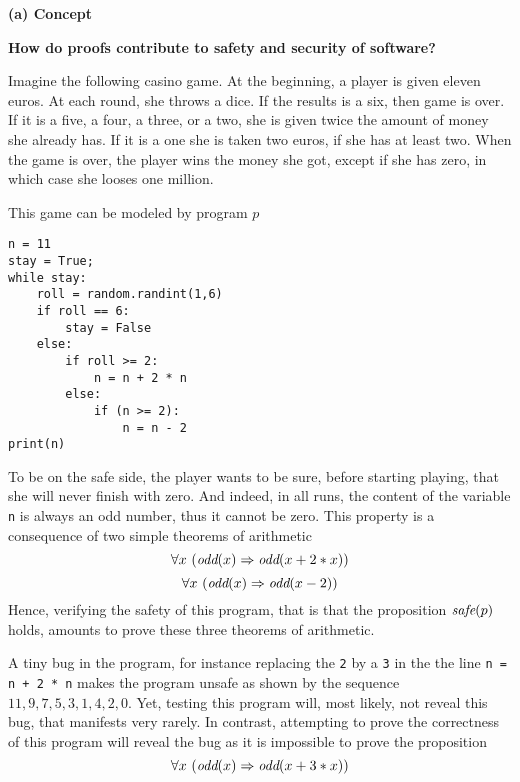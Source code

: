 {\bf \Large (a) Concept}

\begin{framed}
\begin{center}
{\bf \Large How do proofs contribute to safety and security of software?}
\end{center}
  
Imagine the following casino game. At the beginning, a player is given
eleven euros. At each round, she throws a dice. If the results is a
six, then game is over.  If it is a five, a four, a three, or a two,
she is given twice the amount of money she already has. If it is a one
she is taken two euros, if she has at least two.  When the game is
over, the player wins the money she got, except if she has zero, in
which case she looses one million.

This game can be modeled by program $p$
\begin{verbatim}
n = 11
stay = True;
while stay: 
    roll = random.randint(1,6)
    if roll == 6:
        stay = False
    else:
        if roll >= 2:
            n = n + 2 * n
        else:
            if (n >= 2):
                n = n - 2
print(n)
\end{verbatim}

To be on the safe side, the player wants to be sure, before starting
playing, that she will never finish with zero.  And indeed, in all runs,
the content of the variable {\tt n} is always an odd number, thus it
cannot be zero. This property is a consequence of two simple
theorems of arithmetic
$$\forall x~(\mbox{\it odd}(x) \Rightarrow \mbox{\it odd}(x + 2 * x))$$
$$\forall x~(\mbox{\it odd}(x) \Rightarrow \mbox{\it odd}(x - 2))$$
Hence, verifying the safety of this program, that is that the
proposition 
${\mbox{\it safe}}(p)$ holds, 
amounts to prove these three theorems of arithmetic.

A tiny bug in the program, for instance replacing the {\tt 2} by a
{\tt 3} in the the line {\tt n = n + 2 * n} makes the program unsafe
as shown by the sequence $11, 9, 7, 5, 3, 1, 4, 2, 0$. Yet, testing
this program will, most likely, not reveal this bug, that manifests
very rarely.  In contrast, attempting to prove the correctness of this
program will
reveal the bug as it is impossible to prove the proposition
$$\forall x~(\mbox{\it odd}(x) \Rightarrow \mbox{\it odd}(x + 3 * x))$$
\end{framed}
\pagebreak
